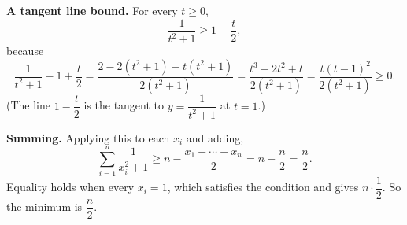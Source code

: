 \textbf{A tangent line bound.} For every $t\ge0$,
\[\dfrac{1}{t^2+1}\ge1-\dfrac {t}{2},\]
because
\[\dfrac{1}{t^2+1}-1+\dfrac {t}{2}=\dfrac{2-2\left(t^2+1\right)+t\left(t^2+1\right)}{2\left(t^2+1\right)}=\dfrac{t^3-2t^2+t}{2\left(t^2+1\right)}=\dfrac{t(t-1)^2}{2\left(t^2+1\right)}\ge0 .\]
(The line $1-\dfrac {t}{2}$ is the tangent to $y=\dfrac{1}{t^2+1}$ at $t=1$.)

\textbf{Summing.} Applying this to each $x_i$ and adding,
\[\sum_{i=1}^{n}\dfrac{1}{x_i^2+1}\ge n-\dfrac{x_1+\cdots+x_n}{2}=n-\dfrac {n}{2}=\dfrac {n}{2} .\]
Equality holds when every $x_i=1$, which satisfies the condition and gives $n\cdot\dfrac{1}{2}$. So the minimum is $\boxed{\dfrac {n}{2}}$.

